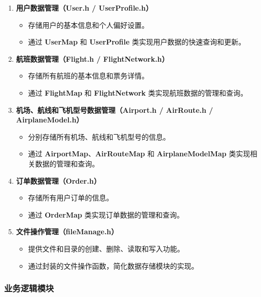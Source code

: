 \documentclass[UTF8, a4paper,12pt]{ctexart}
\begin{document}
\begin{enumerate}
    \item \textbf{用户数据管理（User.h / UserProfile.h）}
    \begin{itemize}
        \item 存储用户的基本信息和个人偏好设置。
        \item 通过 \textbf{UserMap} 和 \textbf{UserProfile} 类实现用户数据的快速查询和更新。
    \end{itemize}
    
    \item \textbf{航班数据管理（Flight.h / FlightNetwork.h）}
    \begin{itemize}
        \item 存储所有航班的基本信息和票务详情。
        \item 通过 \textbf{FlightMap} 和 \textbf{FlightNetwork} 类实现航班数据的管理和查询。
    \end{itemize}
    
    \item \textbf{机场、航线和飞机型号数据管理（Airport.h / AirRoute.h / AirplaneModel.h）}
    \begin{itemize}
        \item 分别存储所有机场、航线和飞机型号的信息。
        \item 通过 \textbf{AirportMap}、\textbf{AirRouteMap} 和 \textbf{AirplaneModelMap} 类实现相关数据的管理和查询。
    \end{itemize}
    
    \item \textbf{订单数据管理（Order.h）}
    \begin{itemize}
        \item 存储所有用户订单的信息。
        \item 通过 \textbf{OrderMap} 类实现订单数据的管理和查询。
    \end{itemize}
    
    \item \textbf{文件操作管理（fileManage.h）}
    \begin{itemize}
        \item 提供文件和目录的创建、删除、读取和写入功能。
        \item 通过封装的文件操作函数，简化数据存储模块的实现。
    \end{itemize}
\end{enumerate}

\subsubsection{业务逻辑模块}
\end{document}
